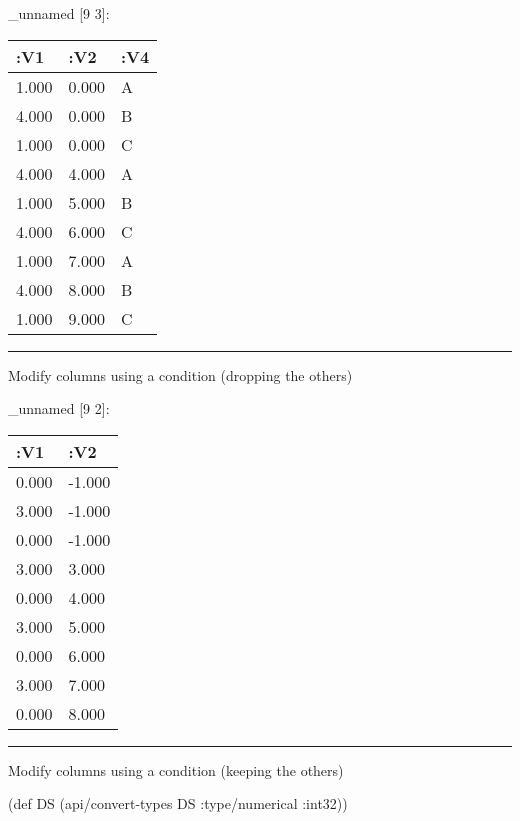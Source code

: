 \documentclass[]{article}
\newenvironment{Shaded}{\begin{snugshade}}{\end{snugshade}}
\newcommand{\KeywordTok}[1]{\textcolor[rgb]{0.13,0.29,0.53}{\textbf{#1}}}
\newcommand{\DecValTok}[1]{\textcolor[rgb]{0.00,0.00,0.81}{#1}}
\newcommand{\FunctionTok}[1]{\textcolor[rgb]{0.00,0.00,0.00}{#1}}
\newcommand{\VariableTok}[1]{\textcolor[rgb]{0.00,0.00,0.00}{#1}}
\newcommand{\BuiltInTok}[1]{#1}
\newcommand{\AttributeTok}[1]{\textcolor[rgb]{0.77,0.63,0.00}{#1}}
\newcommand{\NormalTok}[1]{#1}
\begin{document}
\_unnamed {[}9 3{]}:

\begin{longtable}[]{@{}lll@{}}
\toprule
:V1 & :V2 & :V4\tabularnewline
\midrule
\endhead
1.000 & 0.000 & A\tabularnewline
4.000 & 0.000 & B\tabularnewline
1.000 & 0.000 & C\tabularnewline
4.000 & 4.000 & A\tabularnewline
1.000 & 5.000 & B\tabularnewline
4.000 & 6.000 & C\tabularnewline
1.000 & 7.000 & A\tabularnewline
4.000 & 8.000 & B\tabularnewline
1.000 & 9.000 & C\tabularnewline
\bottomrule
\end{longtable}

\begin{center}\rule{0.5\linewidth}{0.5pt}\end{center}

Modify columns using a condition (dropping the others)

\begin{Shaded}
\end{Shaded}

\_unnamed {[}9 2{]}:

\begin{longtable}[]{@{}ll@{}}
\toprule
:V1 & :V2\tabularnewline
\midrule
\endhead
0.000 & -1.000\tabularnewline
3.000 & -1.000\tabularnewline
0.000 & -1.000\tabularnewline
3.000 & 3.000\tabularnewline
0.000 & 4.000\tabularnewline
3.000 & 5.000\tabularnewline
0.000 & 6.000\tabularnewline
3.000 & 7.000\tabularnewline
0.000 & 8.000\tabularnewline
\bottomrule
\end{longtable}

\begin{center}\rule{0.5\linewidth}{0.5pt}\end{center}

Modify columns using a condition (keeping the others)

\begin{Shaded}
\begin{Highlighting}[]
\NormalTok{(}\BuiltInTok{def}\FunctionTok{ DS }\NormalTok{(api/convert-types DS }\AttributeTok{:type/numerical} \AttributeTok{:int32}\NormalTok{))}
\end{Highlighting}
\end{Shaded}
\end{document}
